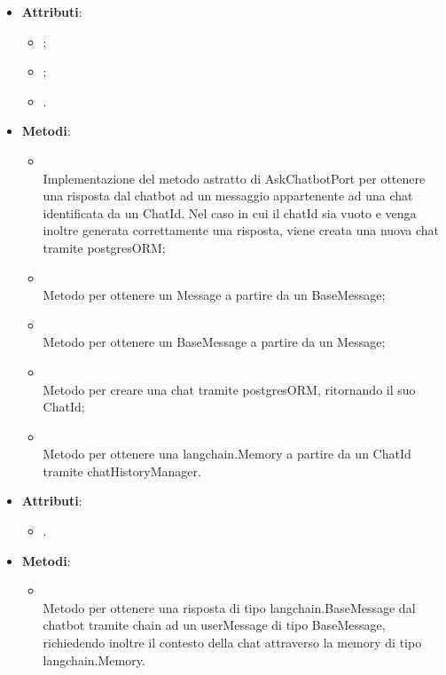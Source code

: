 \documentclass[10pt, a4paper]{article}
\begin{document}
\label{AskChatbotLangchainDettaglio}
\begin{itemize}
    \item \textbf{Attributi}:
    \begin{itemize}
        \item {};
        \item {};
        \item {}.
    \end{itemize}
    \item \textbf{Metodi}:
    \begin{itemize}
        \item {}\\
        Implementazione del metodo astratto di AskChatbotPort per ottenere una risposta dal chatbot ad un messaggio appartenente ad una chat identificata da un ChatId. Nel caso in cui il chatId sia vuoto e venga inoltre generata correttamente una risposta, viene creata una nuova chat tramite postgresORM;
        \item {}\\
        Metodo per ottenere un Message a partire da un BaseMessage;
        \item {}\\
        Metodo per ottenere un BaseMessage a partire da un Message;
        \item {}\\
        Metodo per creare una chat tramite postgresORM, ritornando il suo ChatId;
        \item {}\\
        Metodo per ottenere una langchain.Memory a partire da un ChatId tramite chatHistoryManager.
    \end{itemize}
\end{itemize}

\label{ChatbotLangchainDettaglio}
\begin{itemize}
    \item \textbf{Attributi}:
    \begin{itemize}
        \item {}.
    \end{itemize}
    \item \textbf{Metodi}:
    \begin{itemize}
        \item {}\\
        Metodo per ottenere una risposta di tipo langchain.BaseMessage dal chatbot tramite chain ad un userMessage di tipo BaseMessage, richiedendo inoltre il contesto della chat attraverso la memory di tipo langchain.Memory.
    \end{itemize}
\end{itemize}
\end{document}
